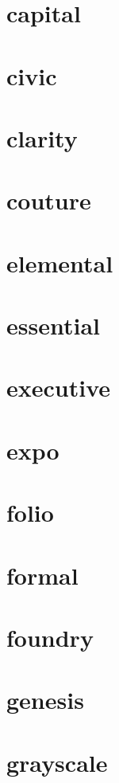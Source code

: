 \section{capital}
\newpage
\section{civic}
\newpage
\section{clarity}
\newpage
\section{couture}
\newpage
\section{elemental}
\newpage
\section{essential}
\newpage
\section{executive}
\newpage
\section{expo}
\newpage
\section{folio}
\newpage
\section{formal}
\newpage
\section{foundry}
\newpage
\section{genesis}
\newpage
\section{grayscale}
\newpage
